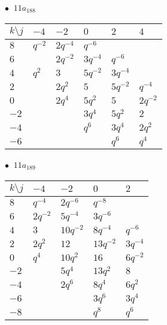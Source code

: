 \begin{minipage}{\linewidth}
$\bullet\ $ $11a_{188}$ \vspace{0.5em} \\
\begin{tabular}{l|lllll}
$k \setminus j$ & $-4$ & $-2$ & $0$ & $2$ & $4$ \\
\hline
$8$ & $q^{-2}$ & $2q^{-4}$ & $q^{-6}$ &  &  \\
$6$ &  & $2q^{-2}$ & $3q^{-4}$ & $q^{-6}$ &  \\
$4$ & $q^{2}$ & $3$ & $5q^{-2}$ & $3q^{-4}$ &  \\
$2$ &  & $2q^{2}$ & $5$ & $5q^{-2}$ & $q^{-4}$ \\
$0$ &  & $2q^{4}$ & $5q^{2}$ & $5$ & $2q^{-2}$ \\
$-2$ &  &  & $3q^{4}$ & $5q^{2}$ & $2$ \\
$-4$ &  &  & $q^{6}$ & $3q^{4}$ & $2q^{2}$ \\
$-6$ &  &  &  & $q^{6}$ & $q^{4}$ \\
\end{tabular}
\vspace{2em}
\end{minipage}
%
\begin{minipage}{\linewidth}
$\bullet\ $ $11a_{189}$ \vspace{0.5em} \\
\begin{tabular}{l|llll}
$k \setminus j$ & $-4$ & $-2$ & $0$ & $2$ \\
\hline
$8$ & $q^{-4}$ & $2q^{-6}$ & $q^{-8}$ &  \\
$6$ & $2q^{-2}$ & $5q^{-4}$ & $3q^{-6}$ &  \\
$4$ & $3$ & $10q^{-2}$ & $8q^{-4}$ & $q^{-6}$ \\
$2$ & $2q^{2}$ & $12$ & $13q^{-2}$ & $3q^{-4}$ \\
$0$ & $q^{4}$ & $10q^{2}$ & $16$ & $6q^{-2}$ \\
$-2$ &  & $5q^{4}$ & $13q^{2}$ & $8$ \\
$-4$ &  & $2q^{6}$ & $8q^{4}$ & $6q^{2}$ \\
$-6$ &  &  & $3q^{6}$ & $3q^{4}$ \\
$-8$ &  &  & $q^{8}$ & $q^{6}$ \\
\end{tabular}
\vspace{2em}
\end{minipage}
%
